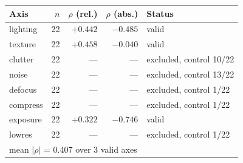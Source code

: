 \begin{tabular}{lrrrl}
\toprule
Axis & $n$ & $\rho$ (rel.) & $\rho$ (abs.) & Status \\
\midrule
lighting & 22 & $+0.442$ & $-0.485$ & valid \\
texture & 22 & $+0.458$ & $-0.040$ & valid \\
clutter & 22 & --- & --- & excluded, control 10/22 \\
noise & 22 & --- & --- & excluded, control 13/22 \\
defocus & 22 & --- & --- & excluded, control 1/22 \\
compress & 22 & --- & --- & excluded, control 1/22 \\
exposure & 22 & $+0.322$ & $-0.746$ & valid \\
lowres & 22 & --- & --- & excluded, control 1/22 \\
\midrule
\multicolumn{5}{l}{mean $|\rho|$ = 0.407 over 3 valid axes} \\
\bottomrule
\end{tabular}
